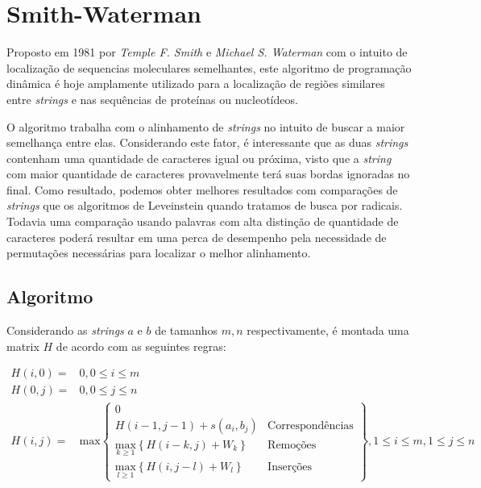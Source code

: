 \section{Smith-Waterman} %
\label{sec:smith_waterman}


Proposto em 1981 por \textit{Temple F. Smith} e \textit{Michael S. Waterman}\cite{smith1981identification} com o intuito de localização de sequencias moleculares semelhantes, este algoritmo de programação dinâmica é hoje amplamente utilizado para a localização de regiões similares entre \textit{strings} e nas sequências de proteínas ou nucleotídeos.

O algoritmo trabalha com o alinhamento de \textit{strings} no intuito de  buscar a maior semelhança entre elas. Considerando este fator, é interessante que as duas \textit{strings} contenham uma quantidade de caracteres igual ou próxima, visto que  a \textit{string} com  maior quantidade de caracteres provavelmente terá suas bordas ignoradas no final. Como resultado, podemos obter melhores resultados com comparações de \textit{strings} que os algoritmos de Leveinstein quando tratamos de busca por radicais. Todavia uma comparação usando palavras com alta distinção de quantidade de caracteres poderá resultar em uma perca de desempenho pela necessidade de permutações necessárias para localizar o melhor alinhamento.

\subsection{Algoritmo} %
\label{sub:algoritmo}

Considerando as \textit{strings} $a$ e $b$ de tamanhos $m,n$ respectivamente, é montada uma matrix $H$ de acordo com as seguintes regras:

\begin{align*}
	H(i,0) =& 0, 0 \leq i \leq m \\
	H(0,j) =& 0, 0 \leq j \leq n \\
	H(i,j) =& \text{max}
	\begin{Bmatrix}
		0  &\\
		H(i-1,j-1) + s(a_i,b_j) & \text{Correspondências}\\
		\underset{k\geq1}{\text{max}} \left\{H(i-k,j) + W_k\right\} & \text{Remoções}\\
		\underset{l\geq1}{\text{max}} \left\{H(i,j-l) + W_l\right\} & \text{Inserções}
	\end{Bmatrix}, 1 \leq i \leq m, 1 \leq j \leq n
\end{align*}

